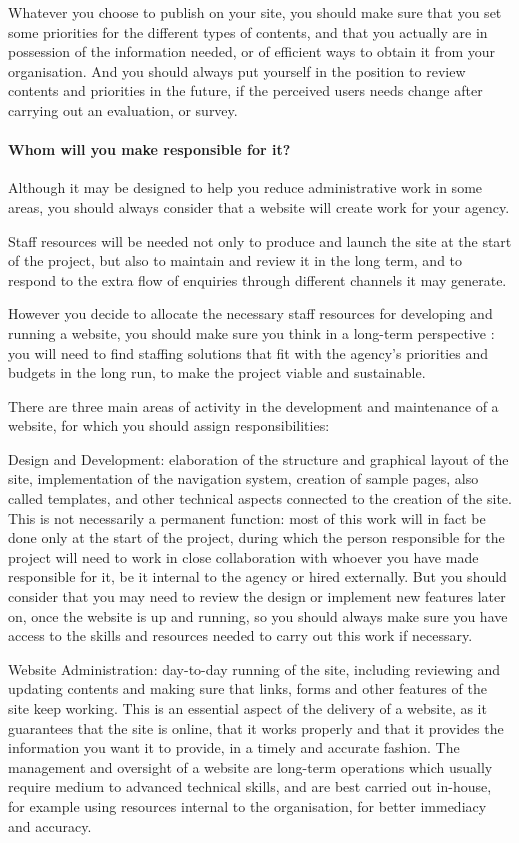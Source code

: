 Whatever you choose to publish on your site, you should make sure that you set some priorities for the different types of contents, and that you actually are in possession of the information needed, or of efficient ways to obtain it from your organisation. And you should always put yourself in the position to review contents and priorities in the future, if the perceived users needs change after carrying out an evaluation, or survey.

\paragraph{Whom will you make responsible for it?}

Although it may be designed to help you reduce administrative work in some areas, you should always consider that a website will create work for your agency.

Staff resources will be needed not only to produce and launch the site at the start of the project, but also to maintain and review it in the long term, and to respond to the extra flow of enquiries through different channels it may generate.

However you decide to allocate the necessary staff resources for developing and running a website, you should make sure you think in a long-term perspective : you will need to find staffing solutions that fit with the agency's priorities and budgets in the long run, to make the project viable and sustainable.

There are three main areas of activity in the development and maintenance of a website, for which you should assign responsibilities:

Design and Development: elaboration of the structure and graphical layout of the site, implementation of the navigation system, creation of sample pages, also called templates, and other technical aspects connected to the creation of the site. This is not necessarily a permanent function: most of this work will in fact be done only at the start of the project, during which the person responsible for the project will need to work in close collaboration with whoever you have made responsible for it, be it internal to the agency or hired externally. But you should consider that you may need to review the design or implement new features later on, once the website is up and running, so you should always make sure you have access to the skills and resources needed to carry out this work if necessary.

Website Administration: day-to-day running of the site, including reviewing and updating contents and making sure that links, forms and other features of the site keep working. This is an essential aspect of the delivery of a website, as it guarantees that the site is online, that it works properly and that it provides the information you want it to provide, in a timely and accurate fashion. The management and oversight of a website are long-term operations which usually require medium to advanced technical skills, and are best carried out in-house, for example using resources internal to the organisation, for better immediacy and accuracy.

